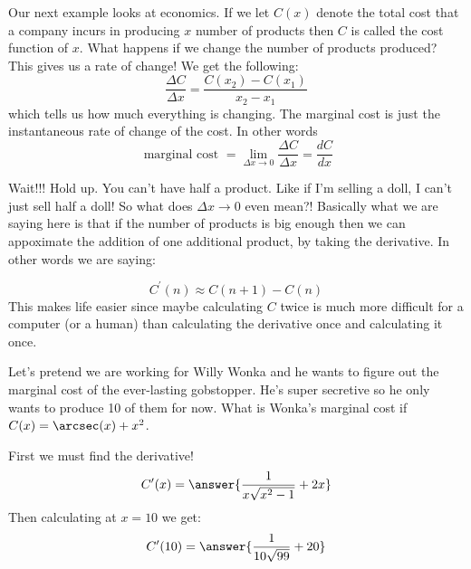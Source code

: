 \documentclass{ximera}
\begin{document}
\begin{example}\label{example:8-2}
Our next example looks at economics. If we let $C(x)$ denote the total cost that a company incurs in producing $x$ number of products then $C$ is called the cost function of $x$. What happens if we change the number of products produced? This gives us a rate of change! We get the following:
\[
\frac{\Delta C}{\Delta x}=\frac{C\left(x_{2}\right)-C\left(x_{1}\right)}{x_{2}-x_{1}}
\]
which tells us how much everything is changing. The marginal cost is just the instantaneous rate of change of the cost. In other words
\[
\text { marginal cost }=\lim _{\Delta x \rightarrow 0} \frac{\Delta C}{\Delta x}=\frac{d C}{d x}
\]

\begin{warning}
Wait!!! Hold up. You can't have half a product. Like if I'm selling a doll, I can't just sell half a doll! So what does $\Delta x \rightarrow 0$ even mean?! Basically what we are saying here is that if the number of products is big enough then we can appoximate the addition of one additional product, by taking the derivative. In other words we are saying:
\end{warning}
\[
C^{\prime}(n) \approx C(n+1)-C(n)
\]
This makes life easier since maybe calculating $C$ twice is much more difficult for a computer (or a human) than calculating the derivative once and calculating it once.

Let's pretend we are working for Willy Wonka and he wants to figure out the marginal cost of the ever-lasting gobstopper. He's super secretive so he only wants to produce 10 of them for now. What is Wonka's marginal cost if $C(x)=\arcsec(x)+x^{2}$.

First we must find the derivative!
\[
C^{\prime}(x)=\answer{\frac{1}{x\sqrt{x^{2}-1}}+2x}
\]
Then calculating at $x=10$ we get:
\[
C^{\prime}(10)=\answer{\frac{1}{10\sqrt{99}}+20}
\]
\end{example}
\end{document}
